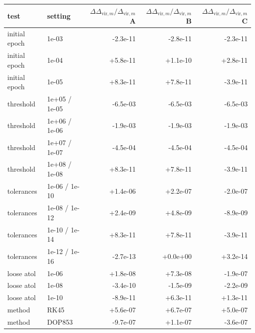 \begin{tabular}{llrrr}
\toprule
test & setting & $\Delta\Delta_{\mathrm{vir},m}/\Delta_{\mathrm{vir},m}$ A & $\Delta\Delta_{\mathrm{vir},m}/\Delta_{\mathrm{vir},m}$ B & $\Delta\Delta_{\mathrm{vir},m}/\Delta_{\mathrm{vir},m}$ C \\
\midrule
initial epoch & 1e-03 & -2.3e-11 & -2.8e-11 & -2.3e-11 \\
initial epoch & 1e-04 & +5.8e-11 & +1.1e-10 & +2.8e-11 \\
initial epoch & 1e-05 & +8.3e-11 & +7.8e-11 & -3.9e-11 \\
threshold & 1e+05 / 1e-05 & -6.5e-03 & -6.5e-03 & -6.5e-03 \\
threshold & 1e+06 / 1e-06 & -1.9e-03 & -1.9e-03 & -1.9e-03 \\
threshold & 1e+07 / 1e-07 & -4.5e-04 & -4.5e-04 & -4.5e-04 \\
threshold & 1e+08 / 1e-08 & +8.3e-11 & +7.8e-11 & -3.9e-11 \\
tolerances & 1e-06 / 1e-10 & +1.4e-06 & +2.2e-07 & -2.0e-07 \\
tolerances & 1e-08 / 1e-12 & +2.4e-09 & +4.8e-09 & -8.9e-09 \\
tolerances & 1e-10 / 1e-14 & +8.3e-11 & +7.8e-11 & -3.9e-11 \\
tolerances & 1e-12 / 1e-16 & -2.7e-13 & +0.0e+00 & +3.2e-14 \\
loose atol & 1e-06 & +1.8e-08 & +7.3e-08 & -1.9e-07 \\
loose atol & 1e-08 & -3.4e-10 & -1.5e-09 & -2.2e-09 \\
loose atol & 1e-10 & -8.9e-11 & +6.3e-11 & +1.3e-11 \\
method & RK45 & +5.6e-07 & +6.7e-07 & +5.0e-07 \\
method & DOP853 & -9.7e-07 & +1.1e-07 & -3.6e-07 \\
\bottomrule
\end{tabular}
